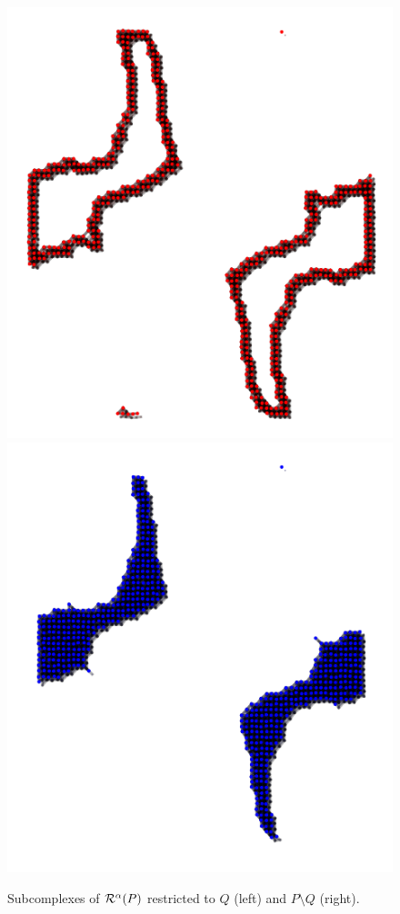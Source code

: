 \begin{figure}[htbp]
\centering
    \includegraphics[scale=0.8]{figures/hsn_net_1.pdf}\hspace{0.4in}
    \includegraphics[scale=0.8]{figures/hsn_net_2.pdf}
    \caption{Subcomplexes of $\mathcal{R}^\alpha(P)$ restricted to $Q$ (left) and $P\setminus Q$ (right).}
    \label{fig:hsn_net}
\end{figure}

